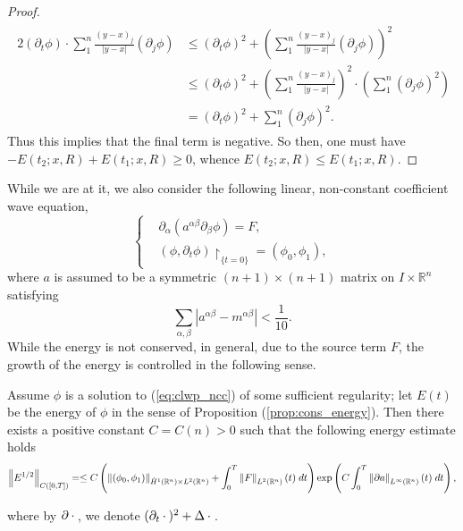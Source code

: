 \documentclass{article}
\begin{document}
\begin{proof}
	\begin{align*}
		\begin{split}
			2(\partial_{t}\phi) \cdot \sum_{1}^{n}\frac{(y - x)_{j}}{|y - x|}(\partial_{j}\phi)&\leq (\partial_{t}\phi)^{2} + \left(\sum_{1}^{n}\frac{(y - x)_{j}}{|y - x|}(\partial_{j}\phi)\right)^{2}\\
			&\leq (\partial_{t}\phi)^{2} + \left(\sum_{1}^{n}\frac{(y - x)_{j}}{|y -x|}\right)^{2} \cdot \left(\sum_{1}^{n}(\partial_{j}\phi)^{2}\right) \\
			&= (\partial_{t}\phi)^{2} + \sum_{1}^{n}(\partial_{j}\phi)^{2}. 
		\end{split}
	\end{align*}
	Thus this implies that the final term is negative. So then, one must have $-E(t_{2}; x, R) + E(t_{1}; x, R) \geq 0$, whence $E(t_{2}; x, R) \leq E(t_{1}; x, R)$. 
	\end{proof}
	
While we are at it, we also consider the following linear, non-constant coefficient wave equation, 
\begin{equation}
	\left\{
	\begin{alignedat}{1}
		&\partial_{\alpha}(a^{\alpha\beta}\partial_{\beta}\phi) = F, 	\\
		&(\phi, \partial_{t}\phi)\upharpoonright_{\{t = 0\}} = (\phi_{0}, \phi_{1}), 
	\end{alignedat}
	\right.
	\label{eq:clwp_ncc} 
\end{equation}
where $a$ is assumed to be a symmetric $(n + 1)\times (n + 1)$ matrix on $I \times \mathbb{R}^{n}$ satisfying 
\begin{equation*}
	\sum_{\alpha,\beta}|a^{\alpha\beta} - m^{\alpha\beta}| < \frac{1}{10}. 
\end{equation*}
While the energy is not conserved, in general, due to the source term $F$, the growth of the energy is controlled in the following sense. 

\begin{theorem}
	Assume $\phi$ is a solution to (\ref{eq:clwp_ncc}) of some sufficient regularity; let $E(t)$ be the energy of $\phi$ in the sense of Proposition (\ref{prop:cons_energy}). Then there exists a positive constant $C = C(n) > 0$ such that the following energy estimate holds 
	\begin{equation}
		\left\Vert E^{1/2} \right\Vert_{C([0,T])} =  \leq C\left(\left\Vert (\phi_{0}, \phi_{1}) \right\Vert_{\dot{H}^{1}(\mathbb{R}^{n}) \times L^{2}(\mathbb{R}^{n})} + \int_{0}^{T}\left\Vert F \right\Vert_{L^{2}(\mathbb{R}^{n})}(t)\;dt\right)\exp\left(C\int_{0}^{T}\left\Vert \partial a \right\Vert_{L^{\infty}(\mathbb{R}^{n})}(t)\;dt\right), 
		\label{eq:clwp_nc_ebound}
	\end{equation} 
	\label{thm:clwp_nc_ebound}
\end{theorem}
where by $\partial \hspace{2pt}\cdot\hspace{2pt}$, we denote $(\partial_{t} \hspace{2pt}\cdot\hspace{2pt})^{2} + \Delta \hspace{2pt}\cdot\hspace{2pt}$. 
\end{document}
